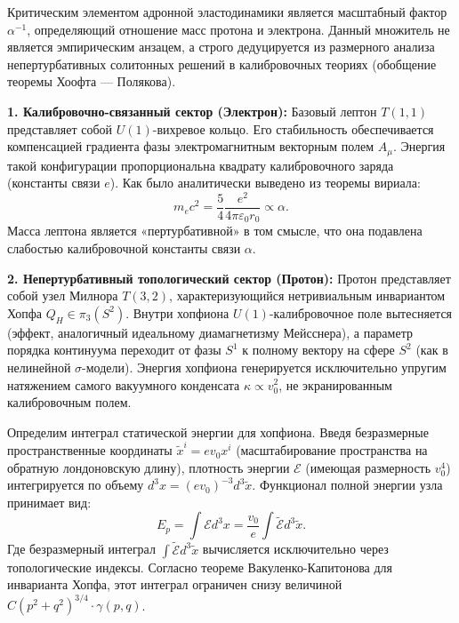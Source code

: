 \documentclass[11pt,a4paper]{article}
\begin{document}
	Критическим элементом адронной эластодинамики является масштабный фактор $\alpha^{-1}$, определяющий отношение масс протона и электрона. Данный множитель не является эмпирическим анзацем, а строго дедуцируется из размерного анализа непертурбативных солитонных решений в калибровочных теориях (обобщение теоремы Хоофта — Полякова).
	
	\textbf{1. Калибровочно-связанный сектор (Электрон):}
	Базовый лептон $T(1,1)$ представляет собой $U(1)$-вихревое кольцо. Его стабильность обеспечивается компенсацией градиента фазы электромагнитным векторным полем $A_\mu$. Энергия такой конфигурации пропорциональна квадрату калибровочного заряда (константы связи $e$). Как было аналитически выведено из теоремы вириала:
	\begin{equation}
		m_e c^2 = \frac{5}{4} \frac{e^2}{4\pi\varepsilon_0 r_0} \propto \alpha.
		\label{eq:me_scaling}
	\end{equation}
	Масса лептона является «пертурбативной» в том смысле, что она подавлена слабостью калибровочной константы связи $\alpha$.
	
	\textbf{2. Непертурбативный топологический сектор (Протон):}
	Протон представляет собой узел Милнора $T(3,2)$, характеризующийся нетривиальным инвариантом Хопфа $Q_H \in \pi_3(S^2)$. 
	Внутри хопфиона $U(1)$-калибровочное поле вытесняется (эффект, аналогичный идеальному диамагнетизму Мейсснера), а параметр порядка континуума переходит от фазы $S^1$ к полному вектору на сфере $S^2$ (как в нелинейной $\sigma$-модели). Энергия хопфиона генерируется исключительно упругим натяжением самого вакуумного конденсата $\kappa \propto v_0^2$, не экранированным калибровочным полем.
	
	Определим интеграл статической энергии для хопфиона. Введя безразмерные пространственные координаты $\tilde{x}^i = e v_0 x^i$ (масштабирование пространства на обратную лондоновскую длину), плотность энергии $\mathcal{E}$ (имеющая размерность $v_0^4$) интегрируется по объему $d^3x = (e v_0)^{-3} d^3\tilde{x}$.
	Функционал полной энергии узла принимает вид:
	\begin{equation}
		E_p = \int \mathcal{E} d^3x = \frac{v_0}{e} \int \tilde{\mathcal{E}} d^3\tilde{x}.
	\end{equation}
	Где безразмерный интеграл $\int \tilde{\mathcal{E}} d^3\tilde{x}$ вычисляется исключительно через топологические индексы. Согласно теореме Вакуленко-Капитонова для инварианта Хопфа, этот интеграл ограничен снизу величиной $C (p^2+q^2)^{3/4} \cdot \gamma(p,q)$.
	
\end{document}
